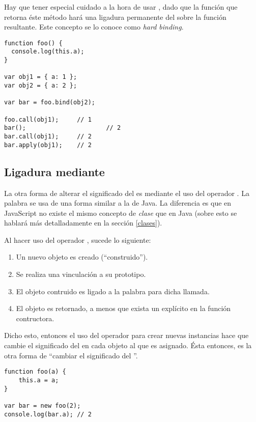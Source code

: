 Hay que tener especial cuidado a la hora de usar , dado que la función que retorna éste método hará una ligadura permanente del  sobre la función resultante. Este concepto se lo conoce como \textit{hard binding}.

\begin{lstlisting}[title={\textit{Hard binding} usando \code{bind}}]
function foo() {
  console.log(this.a);
}

var obj1 = { a: 1 };
var obj2 = { a: 2 };

var bar = foo.bind(obj2);

foo.call(obj1);		// 1
bar();						// 2
bar.call(obj1);		// 2
bar.apply(obj1);	// 2
\end{lstlisting}

\subsection{Ligadura mediante }

La otra forma de alterar el significado del  es mediante el uso del operador . La palabra  se usa de una forma similar a la de Java. La diferencia es que en JavaScript no existe el mismo concepto de \textit{clase} que en Java (sobre esto se hablará más detalladamente en la sección \ref{clases}).

Al hacer uso del operador , sucede lo siguiente:

\begin{enumerate}
\item Un nuevo objeto es creado ("`construido"').
\item Se realiza una vinculación a su prototipo.
\item El objeto contruido es ligado a la palabra  para dicha llamada.
\item El objeto es retornado, a menos que exista un  explícito en la función contructora.
\end{enumerate}

Dicho esto, entonces el uso del operador  para crear nuevas instancias hace que cambie el significado del  en cada objeto al que es asignado. Ésta entonces, es la otra forma de "`cambiar el significado del "'.

\begin{lstlisting}[title={Ligadura mediante \code{new}}]
function foo(a) {
	this.a = a;
}

var bar = new foo(2);
console.log(bar.a); // 2
\end{lstlisting}

